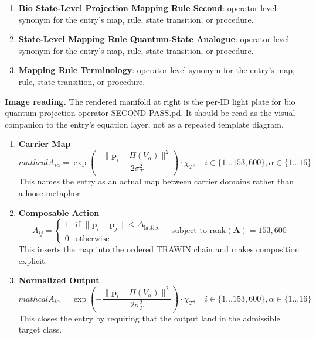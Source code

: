 \begin{enumerate}[leftmargin=1.6em,itemsep=6pt,topsep=4pt]
\item \textbf{Bio State-Level Projection Mapping Rule Second}: operator-level synonym for the entry's map, rule, state transition, or procedure.
\item \textbf{State-Level Mapping Rule Quantum-State Analogue}: operator-level synonym for the entry's map, rule, state transition, or procedure.
\item \textbf{Mapping Rule Terminology}: operator-level synonym for the entry's map, rule, state transition, or procedure.
\end{enumerate}

\begin{samepage}
\noindent\begin{minipage}[t]{0.45\linewidth}
\vspace{0pt}
\raggedright
\scriptsize\textbf{Image reading.} The rendered manifold at right is the per-ID light plate for bio quantum projection operator SECOND PASS.pd. It should be read as the visual companion to the entry's equation layer, not as a repeated template diagram.\par
\end{minipage}\hfill
\begin{minipage}[t]{0.53\linewidth}
\vspace*{-0.10in}
\raggedright
{}
\end{minipage}
\end{samepage}

\clearpage


\begin{enumerate}[leftmargin=1.6em,itemsep=9pt,topsep=6pt]
\item \textbf{Carrier Map}
\[
mathcal{A}_{i \alpha} = \exp\left( -\frac{\|\mathbf{p}_i - \Pi(V_\alpha)\|^2}{2\sigma_T^2} \right) \cdot \chi_T, \quad i \in \{1 \dots 153,600\}, \alpha \in \{1 \dots 16\}
\]
This names the entry as an actual map between carrier domains rather than a loose metaphor.

\item \textbf{Composable Action}
\[
A_{ij} = \begin{cases} 1 & \text{if } \|\mathbf{p}_i - \mathbf{p}_j\| \leq \Delta_{\text{lattice}} \\ 0 & \text{otherwise} \end{cases} \quad \text{subject to } \text{rank}(\mathbf{A}) = 153,600
\]
This inserts the map into the ordered TRAWIN chain and makes composition explicit.

\item \textbf{Normalized Output}
\[
mathcal{A}_{i \alpha} = \exp\left( -\frac{\|\mathbf{p}_i - \Pi(V_\alpha)\|^2}{2\sigma_T^2} \right) \cdot \chi_T, \quad i \in \{1 \dots 153,600\}, \alpha \in \{1 \dots 16\}
\]
This closes the entry by requiring that the output land in the admissible target class.
\end{enumerate}

